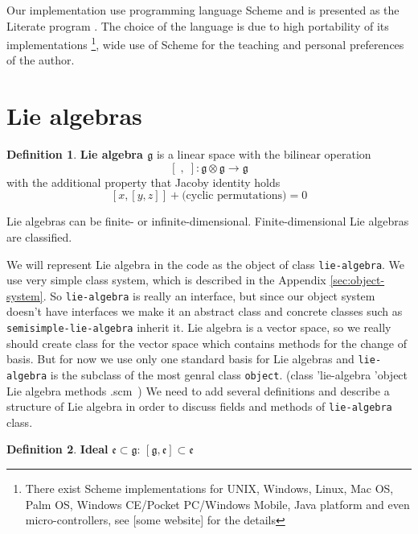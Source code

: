 \documentclass[a4paper,10pt]{article}
\theoremstyle{definition} \newtheorem{Def}{Definition}
\begin{document}
Our implementation use programming language Scheme and is presented as the Literate program \cite{knuth1992literate}. The choice of the language is due to high portability of its implementations \footnote{There exist Scheme implementations for UNIX, Windows, Linux, Mac OS, Palm OS, Windows CE/Pocket PC/Windows Mobile, Java platform and even micro-controllers, see [some website] for the details}, wide use of Scheme for the teaching \cite{abelson1996structure} and personal preferences of the author. 

\section{Lie algebras}
\label{sec:lie-algebras}

\begin{Def}
  {\bf Lie algebra $\mathfrak{g}$} is a linear space with the bilinear operation
  \begin{equation}
    \label{eq:1}
    \left[\;,\;\right]:\mathfrak{g}\otimes \mathfrak{g}\to \mathfrak{g}
  \end{equation}
  with the additional property that Jacoby identity holds
  \begin{equation}
    \label{eq:2}
    [x,[y,z]]+\text{(cyclic permutations)}=0
  \end{equation}
\end{Def}
Lie algebras can be finite- or infinite-dimensional. Finite-dimensional Lie algebras are classified.

We will represent Lie algebra in the code as the object of class {\tt{}lie-algebra}. We use very simple class system, which is described in the Appendix \ref{sec:object-system}. So {\tt{}lie-algebra} is really an interface, but since our object system doesn't have interfaces we make it an abstract class and concrete classes such as {\tt{}semisimple-lie-algebra} inherit it.
Lie algebra is a vector space, so we really should create class for the vector space which contains methods for the change of basis. But for now we use only one standard basis for Lie algebras and {\tt{}lie-algebra} is the subclass of the most genral class {\tt{}object}.
\nwenddocs{}\endmoddef
(class 'lie-algebra 'object
       \LA{}Lie algebra methods .scm~{\nwtagstyle{}}\RA{})
\nwendcode{}\nwdocspar
We need to add several definitions and describe a structure of Lie algebra in order to discuss fields and methods of {\tt{}lie-algebra} class.
\begin{Def}
  {\bf Ideal} $\mathfrak{e}\subset\mathfrak{g}$: $[\mathfrak{g},\mathfrak{e}]\subset \mathfrak{e}$
\end{Def}
\end{document}
